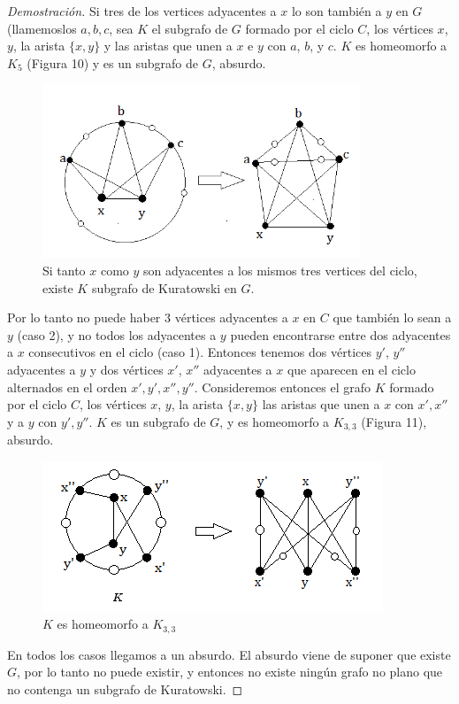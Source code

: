 \documentclass{article}
\begin{document}
\begin{proof}[Demostración]
Si tres de los vertices adyacentes a $x$ lo son también a $y$ en $G$ (llamemoslos $a, b, c$, sea $K$ el subgrafo de $G$ formado por el ciclo $C$, los vértices $x$, $y$, la arista $\{x,y\}$ y las aristas que unen a $x$ e $y$ con $a$, $b$, y $c$. $K$ es homeomorfo a $K_5$ (Figura 10) y es un subgrafo de $G$, absurdo.

 \begin{figure}[htp]
\centering
\includegraphics[width=9.5cm]{img/kura10}
\caption{Si tanto $x$ como $y$ son adyacentes a los mismos tres vertices del ciclo, existe $K$ subgrafo de Kuratowski en $G$.}
\label{fig:kura10}
\end{figure}


Por lo tanto no puede haber 3 vértices adyacentes a $x$ en $C$ que también lo sean a $y$ (caso 2), y no todos los adyacentes a $y$ pueden encontrarse entre dos adyacentes a $x$ consecutivos en el ciclo (caso 1). Entonces tenemos dos vértices $y'$, $y''$ adyacentes a $y$ y dos vértices $x'$, $x''$ adyacentes a $x$ que aparecen en el ciclo alternados en el orden $x', y', x'', y''$. Consideremos entonces el grafo $K$ formado por el ciclo $C$, los vértices $x$, $y$, la arista $\{x,y\}$ las aristas que unen a $x$ con $x', x''$ y a $y$ con $y', y''$. $K$ es un subgrafo de $G$, y es homeomorfo a $K_{3,3}$ (Figura 11), absurdo.
\begin{figure}[htp]
\centering

\includegraphics{img/kura11}
\caption{$K$ es homeomorfo a $K_{3,3}$}
\label{fig:kura11}
\end{figure}

En todos los casos llegamos a un absurdo. El absurdo viene de suponer que existe $G$, por lo tanto no puede existir, y entonces no existe ningún grafo no plano que no contenga un subgrafo de Kuratowski.

\end{proof}
\end{document}

